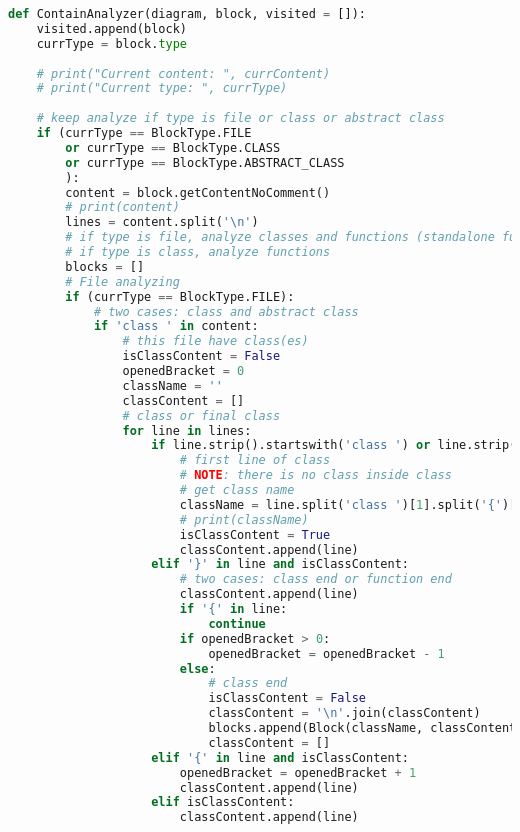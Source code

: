 \begin{lstlisting}[language=Python, caption={$\texttt{ContainAnalyzer}$ function.}, label={lst:10}]
def ContainAnalyzer(diagram, block, visited = []):
    visited.append(block)
    currType = block.type
    
    # print("Current content: ", currContent)
    # print("Current type: ", currType)
    
    # keep analyze if type is file or class or abstract class
    if (currType == BlockType.FILE 
        or currType == BlockType.CLASS
        or currType == BlockType.ABSTRACT_CLASS
        ):
        content = block.getContentNoComment()
        # print(content)
        lines = content.split('\n')
        # if type is file, analyze classes and functions (standalone functions)
        # if type is class, analyze functions
        blocks = []
        # File analyzing
        if (currType == BlockType.FILE):
            # two cases: class and abstract class
            if 'class ' in content:
                # this file have class(es)
                isClassContent = False
                openedBracket = 0
                className = ''
                classContent = []
                # class or final class
                for line in lines:
                    if line.strip().startswith('class ') or line.strip().startswith('final class '):
                        # first line of class
                        # NOTE: there is no class inside class
                        # get class name
                        className = line.split('class ')[1].split('{')[0].strip()
                        # print(className)
                        isClassContent = True
                        classContent.append(line)
                    elif '}' in line and isClassContent:
                        # two cases: class end or function end
                        classContent.append(line)
                        if '{' in line:
                            continue
                        if openedBracket > 0:
                            openedBracket = openedBracket - 1
                        else: 
                            # class end
                            isClassContent = False
                            classContent = '\n'.join(classContent)
                            blocks.append(Block(className, classContent, BlockType.CLASS))
                            classContent = []
                    elif '{' in line and isClassContent:
                        openedBracket = openedBracket + 1
                        classContent.append(line)
                    elif isClassContent:
                        classContent.append(line)
                

\end{lstlisting}
